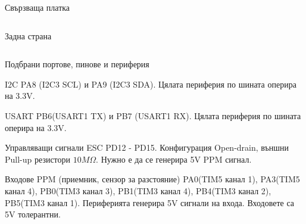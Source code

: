\documentclass{beamer}
\begin{document}
\begin{frame}{Свързваща платка}
\begin{columns}
		Задна страна
	\end{columns}

\end{frame}


\begin{frame}{Подбрани портове, пинове и периферия}
	\pause
		\begin{block}{I2C}
			\pause
				PA8 (I2C3 SCL) и PA9 (I2C3 SDA). Цялата периферия по шината оперира на 3.3V.
		\end{block}
		\pause

		\begin{block}{USART}
			\pause
			PB6(USART1 TX) и PB7 (USART1 RX). Цялата периферия по шината оперира на 3.3V.
		\end{block}
		\pause

		\begin{block}{Управляващи сигнали ESC}
			\pause
			PD12 - PD15. Конфигурация Open-drain, външни Pull-up резистори \(10M\Omega\).
			Нужно е да се генерира 5V PPM сигнал.
		\end{block}

\end{frame}


\begin{frame}[t]
\pause

		\begin{block}{Входове PPM (приемник, сензор за разстояние)}
			\pause
						PA0(TIM5 канал 1), PA3(TIM5 канал 4), PB0(TIM3 канал 3),
			PB1(TIM3 канал 4), PB4(TIM3 канал 2), PB5(TIM3 канал 1).
			Периферията генерира 5V сигнали на входа. Входовете са 5V толерантни.
		\end{block}

\end{frame}
\end{document}
